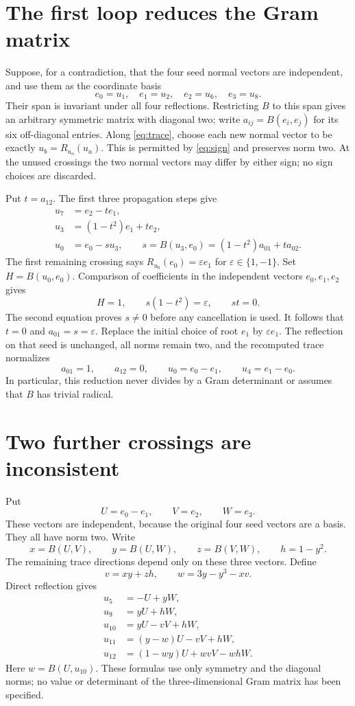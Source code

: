 \documentclass[11pt]{article}
\begin{document}
\section{The first loop reduces the Gram matrix}

Suppose, for a contradiction, that the four seed normal vectors are
independent, and use them as the coordinate basis
\[
                  e_0=u_1,\quad e_1=u_2,\quad
                  e_2=u_6,\quad e_3=u_8.
\]
Their span is invariant under all four reflections. Restricting $B$
to this span gives an arbitrary symmetric matrix with diagonal two;
write $a_{ij}=B(e_i,e_j)$ for its six off-diagonal entries.
Along \eqref{eq:trace}, choose each new normal vector to be exactly
$u_b=R_{u_o}(u_a)$. This is permitted by \eqref{eq:sign} and preserves
norm two. At the unused crossings the two normal vectors may differ
by either sign; no sign choices are discarded.

Put $t=a_{12}$. The first three propagation steps give
\[
 \begin{split}
 u_7&=e_2-te_1,\\
 u_3&=(1-t^2)e_1+te_2,\\
 u_0&=e_0-su_3,\qquad
             s=B(u_3,e_0)=(1-t^2)a_{01}+ta_{02}.
 \end{split}
\]
The first remaining crossing says $R_{u_0}(e_0)=\varepsilon e_1$
for $\varepsilon\in\{1,-1\}$. Set $H=B(u_0,e_0)$.
Comparison of coefficients in the independent vectors $e_0,e_1,e_2$
gives
\[
                  H=1,\qquad s(1-t^2)=\varepsilon,\qquad st=0.
\]
The second equation proves $s\ne0$ before any cancellation is used.
It follows that $t=0$ and $a_{01}=s=\varepsilon$.
Replace the initial choice of root $e_1$ by $\varepsilon e_1$.
The reflection on that seed is unchanged, all norms remain two,
and the recomputed trace normalizes
\[
              a_{01}=1,\qquad a_{12}=0,\qquad
              u_0=e_0-e_1,\qquad u_4=e_1-e_0.
\]
In particular, this reduction never divides by a Gram determinant or
assumes that $B$ has trivial radical.

\section{Two further crossings are inconsistent}

Put
\[
              U=e_0-e_1,\qquad V=e_2,\qquad W=e_3.
\]
These vectors are independent, because the original four seed vectors
are a basis. They all have norm two. Write
\[
 x=B(U,V),\qquad y=B(U,W),\qquad z=B(V,W),\qquad h=1-y^2.
\]
The remaining trace directions depend only on these three vectors.
Define
\[
                 v=xy+zh,\qquad w=3y-y^3-xv.
\]
Direct reflection gives
\begin{align*}
 u_5&=-U+yW,\\
 u_9&=yU+hW,\\
 u_{10}&=yU-vV+hW,\\
 u_{11}&=(y-w)U-vV+hW,\\
 u_{12}&=(1-wy)U+wvV-whW.
\end{align*}
Here $w=B(U,u_{10})$. These formulas use only symmetry and the
diagonal norms; no value or determinant of the three-dimensional
Gram matrix has been specified.
\end{document}
